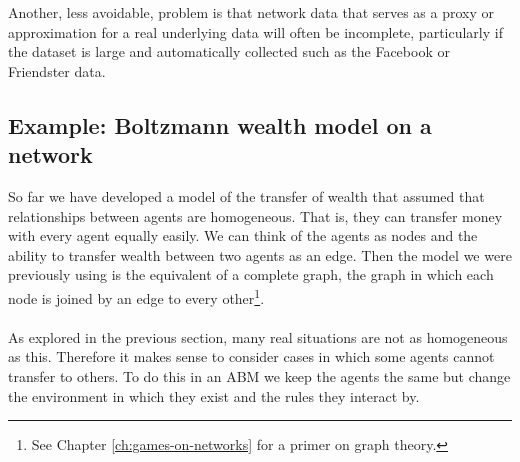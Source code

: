 \label{mm}
Another, less avoidable, problem is that network data that serves as a proxy or approximation for a real underlying data will often be incomplete, particularly if the dataset is large and automatically collected such as the Facebook or Friendster data.
\subsection{Example: Boltzmann wealth model on a network}
So far we have developed a model of the transfer of wealth that assumed that relationships between agents are homogeneous. That is, they can transfer money with every agent equally easily. We can think of the agents as nodes and the ability to transfer wealth between two agents as an edge. Then the model we were previously using is the equivalent of a complete graph, the graph in which each node is joined by an edge to every other\footnote{See Chapter \ref{ch:games-on-networks} for a primer on graph theory.}.\\
\\
As explored in the previous section, many real situations are not as homogeneous as this. Therefore it makes sense to consider cases in which some agents cannot transfer to others. To do this in an ABM we keep the agents the same but change the environment in which they exist and the rules they interact by.
